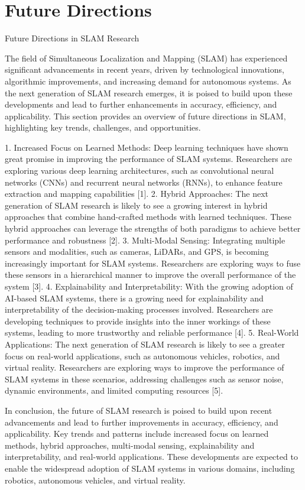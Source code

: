 \documentclass[conference]{IEEEtran}
\begin{document}
\section{Future Directions}
Future Directions in SLAM Research

The field of Simultaneous Localization and Mapping (SLAM) has experienced significant advancements in recent years, driven by technological innovations, algorithmic improvements, and increasing demand for autonomous systems. As the next generation of SLAM research emerges, it is poised to build upon these developments and lead to further enhancements in accuracy, efficiency, and applicability. This section provides an overview of future directions in SLAM, highlighting key trends, challenges, and opportunities.

1. Increased Focus on Learned Methods: Deep learning techniques have shown great promise in improving the performance of SLAM systems. Researchers are exploring various deep learning architectures, such as convolutional neural networks (CNNs) and recurrent neural networks (RNNs), to enhance feature extraction and mapping capabilities [1].
2. Hybrid Approaches: The next generation of SLAM research is likely to see a growing interest in hybrid approaches that combine hand-crafted methods with learned techniques. These hybrid approaches can leverage the strengths of both paradigms to achieve better performance and robustness [2].
3. Multi-Modal Sensing: Integrating multiple sensors and modalities, such as cameras, LiDARs, and GPS, is becoming increasingly important for SLAM systems. Researchers are exploring ways to fuse these sensors in a hierarchical manner to improve the overall performance of the system [3].
4. Explainability and Interpretability: With the growing adoption of AI-based SLAM systems, there is a growing need for explainability and interpretability of the decision-making processes involved. Researchers are developing techniques to provide insights into the inner workings of these systems, leading to more trustworthy and reliable performance [4].
5. Real-World Applications: The next generation of SLAM research is likely to see a greater focus on real-world applications, such as autonomous vehicles, robotics, and virtual reality. Researchers are exploring ways to improve the performance of SLAM systems in these scenarios, addressing challenges such as sensor noise, dynamic environments, and limited computing resources [5].

In conclusion, the future of SLAM research is poised to build upon recent advancements and lead to further improvements in accuracy, efficiency, and applicability. Key trends and patterns include increased focus on learned methods, hybrid approaches, multi-modal sensing, explainability and interpretability, and real-world applications. These developments are expected to enable the widespread adoption of SLAM systems in various domains, including robotics, autonomous vehicles, and virtual reality.
\end{document}
